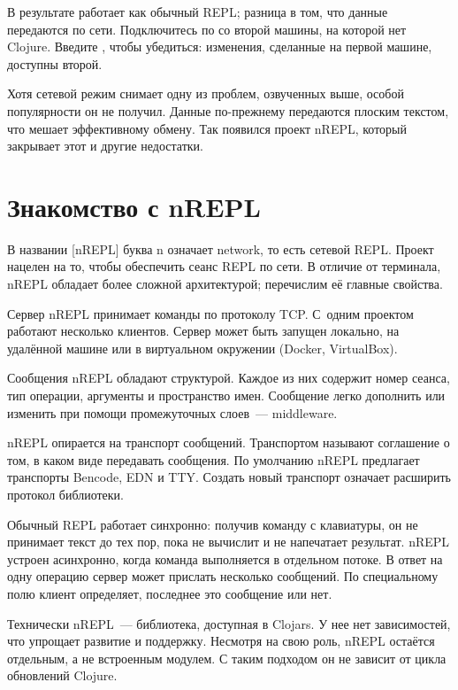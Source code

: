 В результате  работает как обычный REPL; разница в том, что данные передаются по сети. Подключитесь по  со второй машины, на которой нет Clojure. Введите , чтобы убедиться: изменения, сделанные на первой машине, доступны второй.


Хотя сетевой режим снимает одну из проблем, озвученных выше, особой популярности он не получил. Данные по-прежнему передаются плоским текстом, что мешает эффективному обмену. Так появился проект nREPL, который закрывает этот и другие недостатки.

\section{Знакомство с nREPL}

\def\urlnreplorg{https://nrepl.org}


В названии \footurl{nREPL}{\urlnreplorg}[nREPL] буква n означает network, то есть сетевой REPL. Проект нацелен на то, чтобы обеспечить сеанс REPL по сети. В отличие от терминала, nREPL обладает более сложной архитектурой; перечислим её главные свойства.

Сервер nREPL принимает команды по протоколу TCP. С~одним проектом работают несколько клиентов. Сервер может быть запущен локально, на удалённой машине или в виртуальном окружении (Docker, VirtualBox).


Сообщения nREPL обладают структурой. Каждое из них содержит номер сеанса, тип операции, аргументы и пространство имен. Сообщение легко дополнить или изменить при помощи промежуточных слоев~--- middleware.

nREPL опирается на транспорт сообщений. Транспортом называют соглашение о том, в каком виде передавать сообщения. По умолчанию nREPL предлагает транспорты Bencode, EDN и TTY. Создать новый транспорт означает расширить протокол библиотеки.

Обычный REPL работает синхронно: получив команду с клавиатуры, он не принимает текст до тех пор, пока не вычислит и не напечатает результат. nREPL устроен асинхронно, когда команда выполняется в отдельном потоке. В ответ на одну операцию сервер может прислать несколько сообщений. По специальному полю клиент определяет, последнее это сообщение или нет.

Технически nREPL~--- библиотека, доступная в Clojars. У нее нет зависимостей, что упрощает развитие и поддержку. Несмотря на свою роль, nREPL остаётся отдельным, а не встроенным модулем. С таким подходом он не зависит от цикла обновлений Clojure.


